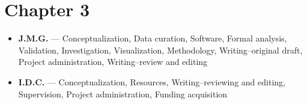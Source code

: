 \documentclass[11pt,a4paper,oneside]{book}
\begin{document}
\section*{Chapter 3}
\begin{itemize}
\item \textbf{J.M.G.} --- Conceptualization, Data curation, Software, Formal analysis, Validation, Investigation, Visualization, Methodology, Writing--original draft, Project administration, Writing--review and editing
\item \textbf{I.D.C.} --- Conceptualization, Resources, Writing--reviewing and editing, Supervision, Project administration, Funding acquisition
\end{itemize}
\end{document}
